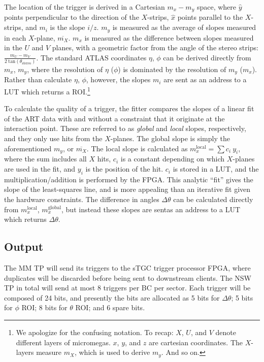 The location of the trigger is derived in a Cartesian $m_x-m_y$ space, where $\hat{y}$ points perpendicular to the direction of the $X$-strips, $\hat{x}$ points parallel to the $X$-strips, and $m_i$ is the slope $i/z$. $m_y$ is measured as the average of slopes measured in each $X$-plane, $\overline{m_X}$. $m_x$ is measured as the difference between slopes measured in the $U$ and $V$ planes, with a geometric factor from the angle of the stereo strips: $\frac{m_U - m_V}{2\ \text{tan}(\theta_\text{stereo})}$. The standard ATLAS coordinates $\eta$, $\phi$ can be derived directly from $m_x$, $m_y$, where the resolution of $\eta$ ($\phi$) is dominated by the resolution of $m_y$ ($m_x$). Rather than calculate $\eta$, $\phi$, however, the slopes $m_i$ are sent as an address to a LUT which returns a ROI.\footnote{We apologize for the confusing notation. To recap: $X$, $U$, and $V$ denote different layers of micromegas. $x$, $y$, and $z$ are cartesian coordinates. The $X$-layers measure $m_X$, which is used to derive $m_y$. And so on.}

To calculate the quality of a trigger, the fitter compares the slopes of a linear fit of the ART data with and without a constraint that it originate at the interaction point. These are referred to as \textit{global} and \textit{local} slopes, respectively, and they only use hits from the $X$-planes. The global slope is simply the aforementioned $m_y$, or $\overline{m_X}$. The local slope is calculated as $m_x^\text{local} = \sum c_i \ y_i$, where the sum includes all $X$ hits, $c_i$ is a constant depending on which $X$-planes are used in the fit, and $y_i$ is the position of the hit. $c_i$ is stored in a LUT, and the multiplication/addition is performed by the FPGA. This analytic ``fit'' gives the slope of the least-squares line, and is more appealing than an iterative fit given the hardware constraints. The difference in angles $\Delta\theta$ can be calculated directly from $m_x^\text{local}$, $m_x^\text{global}$, but instead these slopes are sentas an address to a LUT which returns $\Delta\theta$.

\subsection{Output}
\label{sec:alg-output}

The MM TP will send its triggers to the sTGC trigger processor FPGA, where duplicates will be discarded before being sent to downstream clients. The NSW TP in total will send at most 8 triggers per BC per sector. Each trigger will be composed of 24 bits, and presently the bits are allocated as 5 bits for $\Delta\theta$; 5 bits for $\phi$ ROI; 8 bits for $\theta$ ROI; and 6 spare bits.


